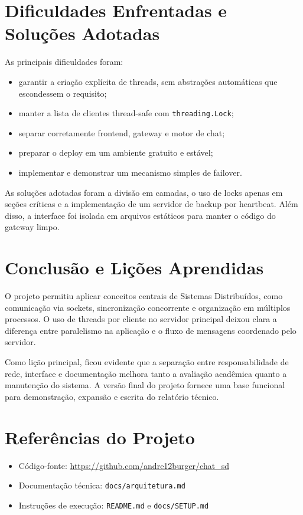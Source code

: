 \documentclass[12pt,a4paper]{article}
\begin{document}
\section{Dificuldades Enfrentadas e Soluções Adotadas}

As principais dificuldades foram:

\begin{itemize}
    \item garantir a criação explícita de threads, sem abstrações automáticas que escondessem o requisito;
    \item manter a lista de clientes thread-safe com \texttt{threading.Lock};
    \item separar corretamente frontend, gateway e motor de chat;
    \item preparar o deploy em um ambiente gratuito e estável;
    \item implementar e demonstrar um mecanismo simples de failover.
\end{itemize}

As soluções adotadas foram a divisão em camadas, o uso de locks apenas em seções críticas e a implementação de um servidor de backup por heartbeat. Além disso, a interface foi isolada em arquivos estáticos para manter o código do gateway limpo.

\section{Conclusão e Lições Aprendidas}

O projeto permitiu aplicar conceitos centrais de Sistemas Distribuídos, como comunicação via sockets, sincronização concorrente e organização em múltiplos processos. O uso de threads por cliente no servidor principal deixou clara a diferença entre paralelismo na aplicação e o fluxo de mensagens coordenado pelo servidor.

Como lição principal, ficou evidente que a separação entre responsabilidade de rede, interface e documentação melhora tanto a avaliação acadêmica quanto a manutenção do sistema. A versão final do projeto fornece uma base funcional para demonstração, expansão e escrita do relatório técnico.

\section{Referências do Projeto}

\begin{itemize}
    \item Código-fonte: \url{https://github.com/andre12burger/chat_sd}
    \item Documentação técnica: \texttt{docs/arquitetura.md}
    \item Instruções de execução: \texttt{README.md} e \texttt{docs/SETUP.md}
\end{itemize}
\end{document}
